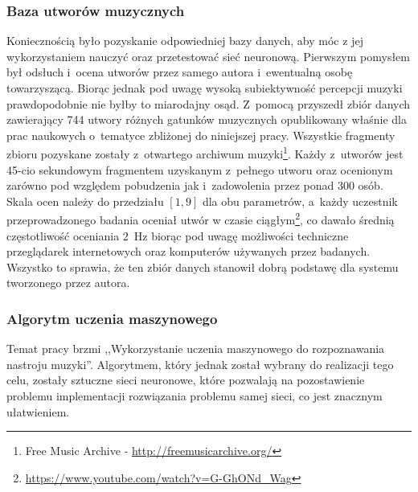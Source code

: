 \subsubsection{Baza utworów muzycznych}
Koniecznością było pozyskanie odpowiedniej bazy danych, aby móc z jej wykorzystaniem nauczyć oraz przetestować sieć neuronową. Pierwszym pomysłem był odsłuch i~ocena utworów przez samego autora i~ewentualną osobę towarzyszącą. Biorąc jednak pod uwagę wysoką subiektywność percepcji muzyki prawdopodobnie nie byłby to miarodajny osąd. Z~pomocą przyszedł zbiór danych\cite{dataSet} zawierający 744 utwory różnych gatunków muzycznych opublikowany właśnie dla prac naukowych o~tematyce zbliżonej do niniejszej pracy. Wszystkie fragmenty zbioru pozyskane zostały z~otwartego archiwum muzyki\footnote{Free Music Archive - \url{http://freemusicarchive.org/}}. Każdy z~utworów jest 45-cio sekundowym fragmentem uzyskanym z~pełnego utworu oraz ocenionym zarówno pod względem pobudzenia jak i~zadowolenia przez ponad 300 osób. Skala ocen należy do przedziału $[1,9]$ dla obu parametrów, a~każdy uczestnik przeprowadzonego badania oceniał utwór w czasie ciągłym\footnote{\url{https://www.youtube.com/watch?v=G-GhONd_Wag}}, co dawało średnią częstotliwość oceniania 2~Hz biorąc pod uwagę możliwości techniczne przeglądarek internetowych oraz komputerów używanych przez badanych. Wszystko to sprawia, że ten zbiór danych stanowił dobrą podstawę dla systemu tworzonego przez autora. 

\subsubsection{Algorytm uczenia maszynowego}
Temat pracy brzmi ,,Wykorzystanie uczenia maszynowego do rozpoznawania nastroju muzyki''. Algorytmem, który jednak został wybrany do realizacji tego celu, zostały sztuczne sieci neuronowe, które pozwalają na pozostawienie problemu implementacji rozwiązania problemu samej sieci, co jest znacznym ułatwieniem.

